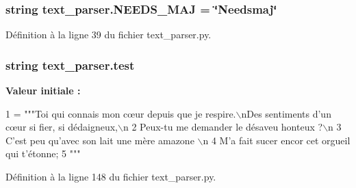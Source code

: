 \hypertarget{namespacetext__parser_a580d1a466df1af504888120208496a4e}{}
\subsubsection[{N\+E\+E\+D\+S\+\_\+\+M\+A\+J}]{\setlength{\rightskip}{0pt plus 5cm}string text\+\_\+parser.\+N\+E\+E\+D\+S\+\_\+\+M\+A\+J = \char`\"{}Needsmaj\char`\"{}}\label{namespacetext__parser_a580d1a466df1af504888120208496a4e}


Définition à la ligne 39 du fichier text\+\_\+parser.\+py.

\hypertarget{namespacetext__parser_a692eca980815747967fc728d1ad2417d}{}
\subsubsection[{test}]{\setlength{\rightskip}{0pt plus 5cm}string text\+\_\+parser.\+test}\label{namespacetext__parser_a692eca980815747967fc728d1ad2417d}
{\bfseries Valeur initiale \+:}
\begin{DoxyCode}
1 = \textcolor{stringliteral}{"""Toi qui connais mon cœur depuis que je respire.\(\backslash\)nDes sentiments d’un cœur si fier, si dédaigneux,\(\backslash\)n}
2 \textcolor{stringliteral}{Peux-tu me demander le désaveu honteux ?\(\backslash\)n}
3 \textcolor{stringliteral}{C’est peu qu’avec son lait une mère amazone \(\backslash\)n}
4 \textcolor{stringliteral}{M’a fait sucer encor cet orgueil qui t’étonne;}
5 \textcolor{stringliteral}{    """}
\end{DoxyCode}


Définition à la ligne 148 du fichier text\+\_\+parser.\+py.

